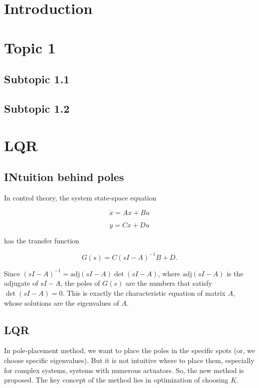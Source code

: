 \tableofcontents
\newpage


\section{Introduction}

\section{Topic 1}
\subsection{Subtopic 1.1}

\subsection{Subtopic 1.2}

\section{LQR}

\subsection{INtuition behind poles}
In control theory, the system state-space equation

\[\dot{x} = Ax+Bu\]

\[y=Cx+Du\]

has the transfer function

\[G(s)=C(sI-A)^{-1}B+D.\]

Since \((sI-A)^{-1}=\text{adj}(sI-A)\det(sI-A)\), where \(\text{adj}(sI-A)\) is the adjugate of \(sI-A\), the poles of \(G(s)\) are the numbers that satisfy \(\det(sI-A)=0\). This is exactly the characteristic equation of matrix \(A\), whose solutions are the eigenvalues of \(A\).

\subsection{LQR}
In pole-placement method, we want to place the poles in the specific spots (or, we choose specific eigenvalues). But it is not intuitive where to place them, especially for complex systems, systems with numerous actuators.
So, the new method is proposed. The key concept of the method lies in optimization of choosing \(K\). 

